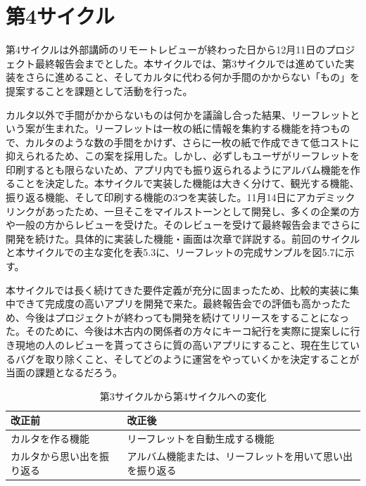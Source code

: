 \section{第4サイクル}
第4サイクルは外部講師のリモートレビューが終わった日から12月11日のプロジェクト最終報告会までとした。本サイクルでは、第3サイクルでは進めていた実装をさらに進めること、そしてカルタに代わる何か手間のかからない「もの」を提案することを課題として活動を行った。
\par カルタ以外で手間がかからないものは何かを議論し合った結果、リーフレットという案が生まれた。リーフレットは一枚の紙に情報を集約する機能を持つもので、カルタのような数の手間をかけず、さらに一枚の紙で作成できて低コストに抑えられるため、この案を採用した。しかし、必ずしもユーザがリーフレットを印刷するとも限らないため、アプリ内でも振り返られるようにアルバム機能を作ることを決定した。本サイクルで実装した機能は大きく分けて、観光する機能、振り返る機能、そして印刷する機能の3つを実装した。11月14日にアカデミックリンクがあったため、一旦そこをマイルストーンとして開発し、多くの企業の方や一般の方からレビューを受けた。そのレビューを受けて最終報告会までさらに開発を続けた。具体的に実装した機能・画面は次章で詳説する。前回のサイクルと本サイクルでの主な変化を表5.3に、リーフレットの完成サンプルを図5.7に示す。
\par 本サイクルでは長く続けてきた要件定義が充分に固まったため、比較的実装に集中できて完成度の高いアプリを開発で来た。最終報告会での評価も高かったため、今後はプロジェクトが終わっても開発を続けてリリースをすることになった。そのために、今後は木古内の関係者の方々にキーコ紀行を実際に提案しに行き現地の人のレビューを貰ってさらに質の高いアプリにすること、現在生じているバグを取り除くこと、そしてどのように運営をやっていくかを決定することが当面の課題となるだろう。

\begin{table}[htb]
\centering
\addtocounter{table}{+0}
\caption{第3サイクルから第4サイクルへの変化}
  \begin{tabular}{|l|l|} \hline
    改正前&改正後  \\ \hline 
    カルタを作る機能 & \parbox{20zw}{リーフレットを自動生成する機能} \\  \hline
    カルタから思い出を振り返る &\parbox{20zw}{アルバム機能または、リーフレットを用いて思い出を振り返る}\\ \hline
  \end{tabular} 
\end{table}

